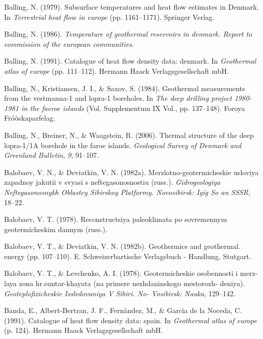 \begin{CSLReferences}{1}{1}
\leavevmode{}%
Balling, N. (1979). Subsurface temperatures and heat flow estimates in {Denmark}. In \emph{Terrestrial heat flow in europe} (pp. 1161--1171). Springer Verlag.

\leavevmode{}%
Balling, N. (1986). \emph{Temperature of geothermal reservoirs in denmark. Report to commission of the european communities.}

\leavevmode{}%
Balling, N. (1991). Catalogue of heat flow density data: denmark. In \emph{Geothermal atlas of europe} (pp. 111--112). Hermann Haack Verlagsgesellschaft mbH.

\leavevmode{}%
Balling, N., Kristiansen, J. I., \& Saxov, S. (1984). Geothermal measurements from the vestmanna-1 and lopra-1 boreholes. In \emph{The deep drilling project 1980-1981 in the faeroe islands} (Vol. Supplementum IX Vol., pp. 137--148). F{o}roya Fróõskaparfelag.

\leavevmode{}%
Balling, N., Breiner, N., \& Waagstein, R. (2006). Thermal structure of the deep lopra-1/1A borehole in the faroe islands. \emph{Geological Survey of Denmark and Greenland Bulletin}, \emph{9}, 91--107.

\leavevmode{}%
Balobaev, V. N., \& Deviatkin, V. N. (1982a). Merzlotno-geotermicheskie usloviya zapadnoy jakutii v svyasi s neftegasonosnostiu (russ.). \emph{Gidrogeologiya Neftegasonosnykh Oblastey Sibirskoy Platformy. Novosibirsk: Igig So an SSSR}, 18--22.

\leavevmode{}%
Balobaev, V. T. (1978). Reconstructsiya paleoklimata po sovremennym geotermicheskim dannym (russ.).

\leavevmode{}%
Balobaev, V. T., \& Deviatkin, V. N. (1982b). Geothermics and geothermal. energy (pp. 107--110). E. Schweizerbartische Verlagsbuch - Handlung, Stutgart.

\leavevmode{}%
Balobaev, V. T., \& Levchenko, A. I. (1978). Geotermicheskie osobennosti i merz- laya zona hr.suntar-khayata (na primere nezhdaninskogo mestorozh- deniya). \emph{Geoteplofizicheskie Issledovaniya V Sibiri. No- Vosibirsk: Nauka}, 129--142.

\leavevmode{}%
Banda, E., Albert-Bertran, J. F., Fernàndez, M., \& Garcia de la Noceda, C. (1991). Catalogue of heat flow density data: spain. In \emph{Geothermal atlas of europe} (p. 124). Hermann Haack Verlagsgesellschaft mbH.


\end{CSLReferences}
